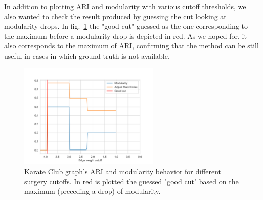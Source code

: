In addition to plotting ARI and modularity with various cutoff thresholds, we also wanted to check the result produced by guessing the cut looking at modularity drops. In fig.~\ref{fig:Karate_Accuracy} the "good cut" guessed as the one corresponding to the maximum before a modularity drop is depicted in red. As we hoped for, it also corresponds to the maximum of ARI, confirming that the method can be still useful in cases in which ground truth is not available.
\begin{figure}
    \centering
    \includegraphics[width=0.6\textwidth]{../KarateClubResults/Surgery Accuracy.png}
    \caption{Karate Club graph’s ARI and modularity behavior for different surgery cutoffs. In red is plotted the guessed "good cut" based on the maximum (preceding a drop) of modularity.}
    \label{fig:Karate_Accuracy}
\end{figure}

